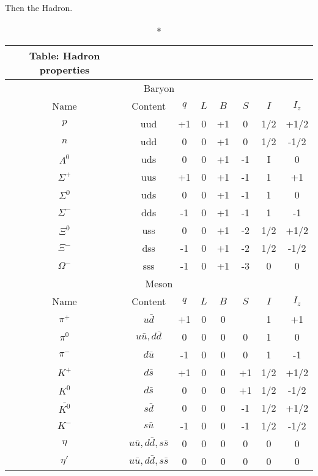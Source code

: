 \documentclass[../../../main.tex]{subfiles}
\begin{document}
Then the Hadron.
\begin{longtable}{cccccccc}
    \caption*{Table: Hadron properties}\\
    \toprule
    \multicolumn{8}{c}{Baryon}                           \\ 
    \midrule
    Name & Content & $q$ & $L$ & $B$ & $S$ & $I$ & $I_z$ \\
    \midrule
    $p$    & uud     & +1  & 0   & +1  & 0   & 1/2 & +1/2  \\
    $n$    & udd     & 0   & 0   & +1  & 0   & 1/2 & -1/2  \\
    $\Lambda^0$   & uds     & 0   & 0   & +1  & -1  & I   & 0     \\
    $\Sigma^+$   & uus     & +1  & 0   & +1  & -1  & 1   & +1    \\
    $\Sigma^0$   & uds     & 0   & 0   & +1  & -1  & 1   & 0     \\
    $\Sigma^-$   & dds     & -1  & 0   & +1  & -1  & 1   & -1    \\
    $\Xi^0$   & uss     & 0   & 0   & +1  & -2  & 1/2 & +1/2  \\
    $\Xi^-$   & dss     & -1  & 0   & +1  & -2  & 1/2 & -1/2  \\
    $\Omega^-$   & sss     & -1  & 0   & +1  & -3  & 0   & 0     \\ 
    \bottomrule
    \toprule
    \multicolumn{8}{c}{Meson}                                                    \\ \midrule
    Name   & Content                       & $q$ & $L$ & $B$ & $S$ & $I$ & $I_z$ \\
    $\pi^+$     & $u \bar{d}$                    & +1  & 0   & 0   &    & 1   & +1    \\
    $\pi^0$     & $u\bar{u}, d\bar{d}$            & 0   & 0   & 0   & 0   & 1   & 0     \\
    $\pi^-$     & $d\bar{u}$                      & -1  & 0   & 0   & 0   & 1   & -1    \\
    $K^+$     & $d\bar{s}$                      & +1  & 0   & 0   & +1   & 1/2 & +1/2  \\
    $K^0$     & $d\bar{s}$                      & 0   & 0   & 0   & +1   & 1/2 & -1/2  \\
    $\bar{K^0}$ & $s\bar{d}$                      & 0   & 0   & 0   & -1   & 1/2 & +1/2  \\
    $K^-$     & $s\bar{u}$                      & -1  & 0   & 0   & -1   & 1/2 & -1/2  \\
    $\eta$    & $u\bar{u}, d\bar{d},s\bar{s}$   & 0   & 0   & 0   & 0   & 0   & 0     \\
    $\eta'$   & $u\bar{u},  d\bar{d}, s\bar{s}$ & 0   & 0   & 0   & 0   & 0   & 0     \\ \bottomrule
\end{longtable}
\end{document}
